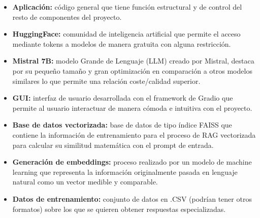 \begin{itemize}

    \item \textbf{Aplicación:} código general que tiene función estructural y de control del resto de componentes del proyecto.
    
    \item \textbf{HuggingFace:} comunidad de inteligencia artificial que permite el acceso mediante tokens a modelos de manera gratuita con alguna restricción.

    \item \textbf{Mistral 7B:} modelo Grande de Lenguaje (LLM) creado por Mistral, destaca por su pequeño tamaño y gran optimización en comparación a otros modelos similares lo que permite una relación coste/calidad superior.
    
    \item \textbf{GUI:} interfaz de usuario desarrollada con el framework de Gradio que permite al usuario interactuar de manera cómoda e intuitiva con el proyecto.
    
    \item \textbf{Base de datos vectorizada:} base de datos de tipo índice FAISS que contiene la información de entrenamiento para el proceso de RAG vectorizada para calcular su similitud matemática con el prompt de entrada.
    
    \item \textbf{Generación de embeddings:} proceso realizado por un modelo de machine learning que representa la información originalmente pasada en lenguaje natural como un vector medible y comparable.
    
    \item \textbf{Datos de entrenamiento:} conjunto de datos en .CSV (podrían tener otros formatos) sobre los que se quieren obtener respuestas especializadas.
    
\end{itemize}

